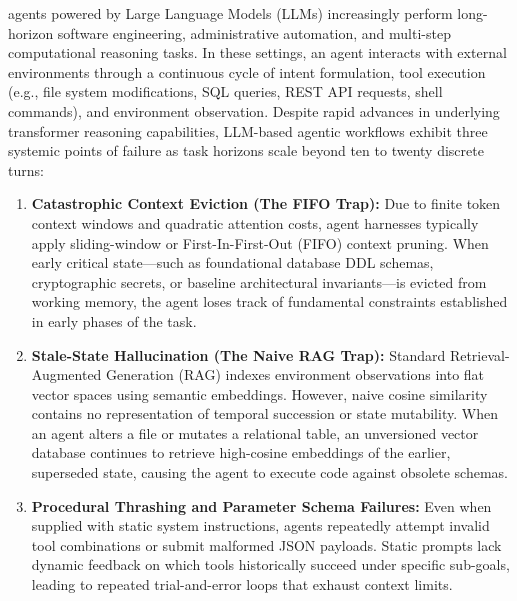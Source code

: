 \documentclass[10pt,journal,compsoc]{IEEEtran}
\begin{document}
\maketitle
\IEEEdisplaynontitleabstractindextext
\IEEEpeerreviewmaketitle


 agents powered by Large Language Models (LLMs) increasingly perform long-horizon software engineering, administrative automation, and multi-step computational reasoning tasks. In these settings, an agent interacts with external environments through a continuous cycle of intent formulation, tool execution (e.g., file system modifications, SQL queries, REST API requests, shell commands), and environment observation. Despite rapid advances in underlying transformer reasoning capabilities, LLM-based agentic workflows exhibit three systemic points of failure as task horizons scale beyond ten to twenty discrete turns:

\begin{enumerate}
    \item \textbf{Catastrophic Context Eviction (The FIFO Trap):} Due to finite token context windows and quadratic attention costs, agent harnesses typically apply sliding-window or First-In-First-Out (FIFO) context pruning. When early critical state—such as foundational database DDL schemas, cryptographic secrets, or baseline architectural invariants—is evicted from working memory, the agent loses track of fundamental constraints established in early phases of the task.
    \item \textbf{Stale-State Hallucination (The Naive RAG Trap):} Standard Retrieval-Augmented Generation (RAG) indexes environment observations into flat vector spaces using semantic embeddings. However, naive cosine similarity contains no representation of temporal succession or state mutability. When an agent alters a file or mutates a relational table, an unversioned vector database continues to retrieve high-cosine embeddings of the earlier, superseded state, causing the agent to execute code against obsolete schemas.
    \item \textbf{Procedural Thrashing and Parameter Schema Failures:} Even when supplied with static system instructions, agents repeatedly attempt invalid tool combinations or submit malformed JSON payloads. Static prompts lack dynamic feedback on which tools historically succeed under specific sub-goals, leading to repeated trial-and-error loops that exhaust context limits.
\end{enumerate}
\end{document}
